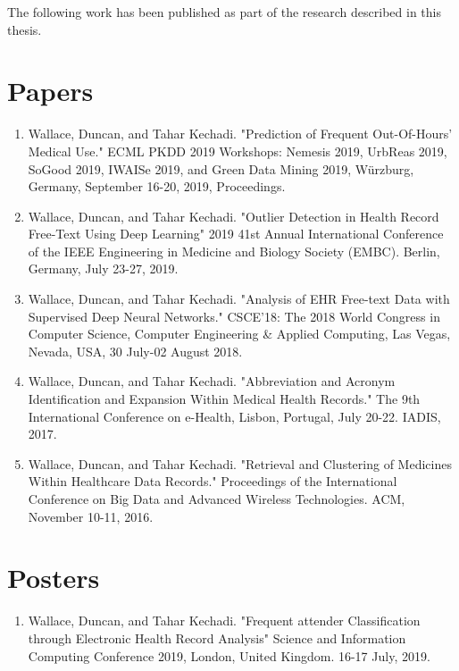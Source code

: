 \begin{abstract2}

The following work has been published as part of the research described in this thesis.

 \section*{Papers}
  \begin{enumerate}
  \item Wallace, Duncan, and Tahar Kechadi. "Prediction of Frequent Out-Of-Hours’ Medical Use." ECML PKDD 2019 Workshops: Nemesis 2019, UrbReas 2019, SoGood 2019, IWAISe 2019, and Green Data Mining 2019,  Würzburg, Germany, September 16-20, 2019, Proceedings.
  \item Wallace, Duncan, and Tahar Kechadi. "Outlier Detection in Health Record Free-Text Using Deep Learning" 2019 41st Annual International Conference of the IEEE Engineering in Medicine and Biology Society (EMBC). Berlin, Germany, July 23-27, 2019.
   \item Wallace, Duncan, and Tahar Kechadi. "Analysis of EHR Free-text Data with Supervised Deep Neural Networks." CSCE'18: The 2018 World Congress in Computer Science, Computer Engineering \& Applied Computing, Las Vegas, Nevada, USA, 30 July-02 August 2018.
  \item Wallace, Duncan, and Tahar Kechadi. "Abbreviation and Acronym Identification and Expansion Within Medical Health Records." The 9th International Conference on e-Health, Lisbon, Portugal, July 20-22. IADIS, 2017.
  \item  Wallace, Duncan, and Tahar Kechadi. "Retrieval and Clustering of Medicines Within Healthcare Data Records." Proceedings of the International Conference on Big Data and Advanced Wireless Technologies. ACM, November 10-11,  2016.
  \end{enumerate}
  \section*{Posters}
  \begin{enumerate}
  \item Wallace, Duncan, and Tahar Kechadi. "Frequent attender Classification through Electronic Health Record Analysis" Science and Information Computing Conference 2019, London, United Kingdom. 16-17 July, 2019. 
  \end{enumerate}
  

\end{abstract2}
